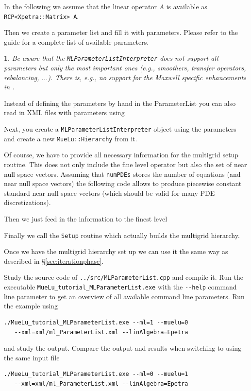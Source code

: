 \documentclass[10pt,fleqn]{book}
\newtheorem*{mycomment}{\ding{42}}
\providecommand\printCppListingSkipLine[1]{

}
\begin{document}
In the following we assume that the linear operator $A$ is available as \verb|RCP<Xpetra::Matrix> A|.

Then we create a parameter list and fill it with \ml parameters. Please refer to the \ml guide \cite{mlguide} for a complete list of available parameters.
\printCppListingSkipLine{MLParameterList.cpp_6.fragment}

\begin{mycomment}
Be aware that the \verb|MLParameterListInterpreter| does not support all \ml parameters but only the most important ones (e.g., smoothers, transfer operators, rebalancing, ...). There is, e.g., no support for the Maxwell specific enhancements in \ml.
\end{mycomment}

Instead of defining the \ml parameters by hand in the ParameterList you can also read in XML files with \ml parameters using
\printCppListingSkipLine{MLParameterList.cpp_4.fragment}

Next, you create a \verb|MLParameterListInterpreter| object using the parameters and create a new \verb|MueLu::Hierarchy| from it.
\printCppListingSkipLine{MLParameterList.cpp_8.fragment}

Of course, we have to provide all necessary information for the multigrid setup routine. This does not only include the fine level operator but also the set of near null space vectors. Assuming that \verb|numPDEs| stores the number of equations (and near null space vectors) the following code allows to produce piecewise constant standard near null space vectors (which should be valid for many PDE discretizations).
\printCppListingSkipLine{MLParameterList.cpp_10.fragment}

Then we just feed in the information to the finest level
\printCppListingSkipLine{MLParameterList.cpp_11.fragment}

Finally we call the \verb|Setup| routine which actually builds the multigrid hierarchy.
\printCppListingSkipLine{MLParameterList.cpp_13.fragment}

Once we have the multigrid hierarchy set up we can use it the same way as described in \S\ref{sec:iterationphase}.

\begin{exercise}
Study the source code of \texttt{../src/MLParameterList.cpp} and compile it. Run the executable \verb|MueLu_tutorial_MLParameterList.exe| with the \verb|--help| command line parameter to get an overview of all available command line parameters. Run the example using
\begin{verbatim}
./MueLu_tutorial_MLParameterList.exe --ml=1 --muelu=0
   --xml=xml/ml_ParameterList.xml --linAlgebra=Epetra
\end{verbatim}
and study the \ml output. Compare the output and results when switching to \muelu using the same input file
\begin{verbatim}
./MueLu_tutorial_MLParameterList.exe --ml=0 --muelu=1
   --xml=xml/ml_ParameterList.xml --linAlgebra=Epetra
\end{verbatim}
\end{exercise}
\end{document}
